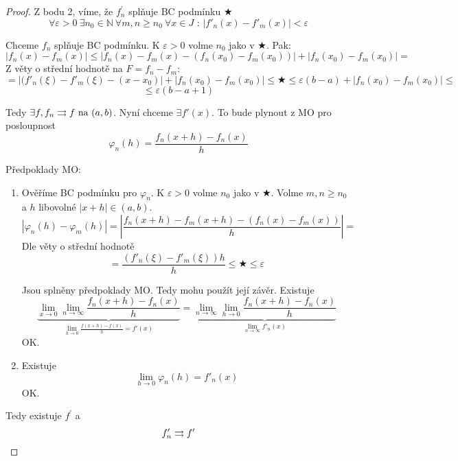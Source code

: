 \begin{proof}
Z bodu 2, víme, že $f^\prime_n$ splňuje BC podmínku $\bigstar$ 
$$\forall \varepsilon > 0 \ \exists n_0 \in \mathbb{N} \ \forall m,n \geq n_0 \ \forall x \in J \textrm{ : } |f'_n(x) - f'_m(x)| < \varepsilon $$

Chceme $f_n$ splňuje BC podmínku. K $\varepsilon > 0$ volme $n_0$ jako v $\bigstar$. Pak:
$$|f_n(x) - f_m(x)| \leq |f_n(x) - f_m(x) - (f_n(x_0) - f_m(x_0))| + |f_n(x_0) - f_m(x_0)| =$$
Z věty o střední hodnotě na $F = f_n - f_m$:
$$= |(f'_n(\xi) - f'_m(\xi) - (x-x_0)| + |f_n(x_0) - f_m(x_0)| \leq \bigstar \leq \varepsilon (b-a) + |f_n(x_0) - f_m(x_0)|\leq $$
$$\leq \varepsilon (b-a+1)$$

Tedy $\exists f, f_n \rightrightarrows f \textrm{ na } (a,b)$. Nyní chceme $\exists f'(x)$. To bude plynout z MO pro posloupnost 
$$\varphi_n (h) = \frac{f_n(x+h)-f_n(x)}{h}$$

Předpoklady MO:
\begin{enumerate}
\item Ověříme BC podmínku pro $\varphi_n$. K $\varepsilon > 0$ volme $n_0$ jako v $\bigstar$. Volme $m,n \geq n_0$ a $h$ libovolné $|x+h| \in (a,b)$.
$$|\varphi_n(h) - \varphi_m(h)| = \left| \frac{f_n(x+h) - f_m(x+h) - (f_n(x) - f_m(x))}{h} \right| = $$
Dle věty o střední hodnotě 
$$ = \frac{(f'_n(\xi) - f'_m(\xi)) h}{h}\leq \bigstar \leq \varepsilon $$

Jsou splněny předpoklady MO. Tedy mohu použít její závěr. Existuje
$$\underbrace{\lim_{x \to 0} \lim_{n \to \infty} \frac{f_n(x+h) - f_n(x)}{h}}_{\lim_{h \to 0} \frac{f(x+h) - f(x)}{h} = f'(x)} = \underbrace{\lim_{n \to \infty} \lim_{h \to 0} \frac {f_n(x+h) - f_n(x)}{h}}_{\lim_{n \to \infty} f'_n(x)}$$
OK.

\item Existuje
$$\lim_{h \to 0} \varphi_n(h) = f'_n(x)$$ OK.
\end{enumerate}
Tedy existuje $f^\prime$ a 
$$f'_n \rightrightarrows f' $$
\end{proof}
